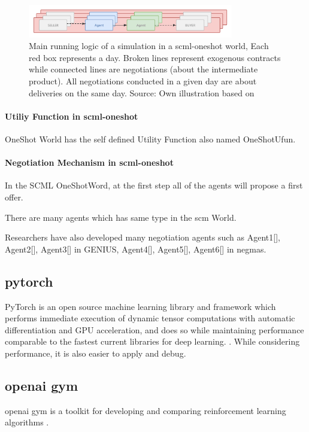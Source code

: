 \begin{figure}[htbp]
\centering
\includegraphics[width=0.8\textwidth]{./images/overview-scml-oneshot.png}
\caption{Main running logic of a simulation in a \gls{scml-oneshot} world, Each red box represents a day. Broken lines represent exogenous contracts while connected lines are negotiations (about the intermediate product). All negotiations conducted in a given day are about deliveries on the same day. Source: Own illustration based on\parencite{Mohammad2021}}
\label{fig:overview-scml-oneshot}
\end{figure}

\paragraph{Utiliy Function in \gls{scml-oneshot}} OneShot World has the self defined Utility Function also named OneShotUfun.
\paragraph{Negotiation Mechanism in \gls{scml-oneshot}} In the SCML OneShotWord, at the first step all of the agents will propose a first offer.

There are many agents which has same type in the \gls{scm} World. 

Researchers have also developed many negotiation agents such as Agent1[], Agent2[], Agent3[] in GENIUS, Agent4[], Agent5[], Agent6[] in \gls{negmas}.

\subsection{\gls{pytorch}} PyTorch is an open source machine learning library and framework which performs immediate execution of dynamic tensor computations with automatic differentiation and GPU acceleration, and does so while maintaining performance comparable to the fastest current libraries for deep learning. \parencite{NEURIPS2019_bdbca288}. While considering performance, it is also easier to apply and debug.

\subsection{\gls{openai gym}}
\gls{openai gym} is a toolkit for developing and comparing reinforcement learning algorithms \parencite{brockman2016openai}.
